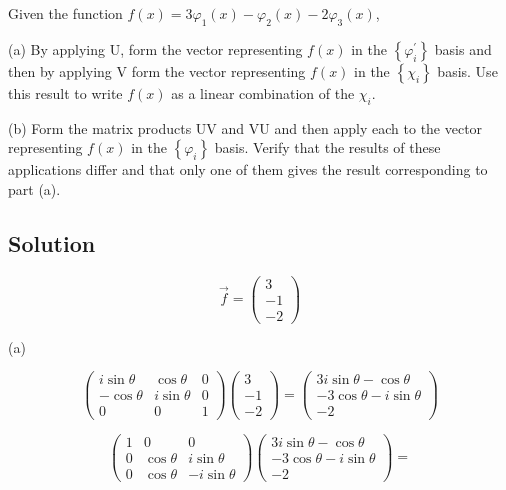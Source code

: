 \documentclass[12pt]{article}
\begin{document}
Given the function \(f(x)=3 \varphi_1(x)-\varphi_2(x)-2 \varphi_3(x)\),

(a) By applying \(\mathrm{U}\), form the vector representing \(f(x)\) in the \(\left\{\varphi_i^{\prime}\right\}\) basis and then by applying \(\mathrm{V}\) form the vector representing \(f(x)\) in the \(\left\{\chi_i\right\}\) basis. Use this result to write \(f(x)\) as a linear combination of the \(\chi_i\).

(b) Form the matrix products UV and VU and then apply each to the vector representing \(f(x)\) in the \(\left\{\varphi_i\right\}\) basis. Verify that the results of these applications differ and that only one of them gives the result corresponding to part (a).

\subsection{Solution}

\[
    \vec{f} = \begin{pmatrix}
        3  \\
        -1 \\
        -2
    \end{pmatrix}
\]

(a)

\[
    \begin{pmatrix}
        i \sin \theta & \cos \theta   & 0 \\
        -\cos \theta  & i \sin \theta & 0 \\
        0             & 0             & 1
    \end{pmatrix}
    \begin{pmatrix}
        3  \\
        -1 \\
        -2
    \end{pmatrix}
    =
    \begin{pmatrix}
        3 i \sin \theta - \cos \theta  \\
        -3 \cos \theta - i \sin \theta \\
        -2
    \end{pmatrix}
\]

\[
    \begin{pmatrix}
        1 & 0           & 0              \\
        0 & \cos \theta & i \sin \theta  \\
        0 & \cos \theta & -i \sin \theta
    \end{pmatrix}
    \begin{pmatrix}
        3 i \sin \theta - \cos \theta  \\
        -3 \cos \theta - i \sin \theta \\
        -2
    \end{pmatrix} =
\]
\end{document}

